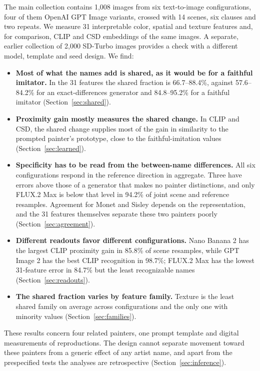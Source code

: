 \documentclass[10pt]{article}
\begin{document}
The main collection contains 1,008 images from six text-to-image configurations, four of them
OpenAI GPT Image variants, crossed with 14 scenes, six clauses and two repeats. We measure 31
interpretable color, spatial and texture features and, for comparison, CLIP \citep{radford2021}
and CSD \citep{somepalli2024style} embeddings of the same images. A separate, earlier
collection of 2,000 SD-Turbo images provides a check with a different model, template and seed
design. We find:
\begin{itemize}
\item \textbf{Most of what the names add is shared, as it would be for a faithful imitator.}
In the 31 features the shared fraction is 66.7--88.4\%, against 57.6--84.2\% for an
exact-differences generator and 84.8--95.2\% for a faithful imitator
(Section~\ref{sec:shared}).
\item \textbf{Proximity gain mostly measures the shared change.} In CLIP and CSD, the shared
change supplies most of the gain in similarity to the prompted painter's prototype, close to
the faithful-imitation values (Section~\ref{sec:learned}).
\item \textbf{Specificity has to be read from the between-name differences.} All six
configurations respond in the reference direction in aggregate. Three have errors above those
of a generator that makes no painter distinctions, and only FLUX.2 Max is below that level in
94.2\% of joint scene and reference resamples. Agreement for Monet and Sisley depends on the
representation, and the 31 features themselves separate these two painters poorly
(Section~\ref{sec:agreement}).
\item \textbf{Different readouts favor different configurations.} Nano Banana 2 has the
largest CLIP proximity gain in 85.8\% of scene resamples, while GPT Image 2 has the best CLIP
recognition in 98.7\%; FLUX.2 Max has the lowest 31-feature error in 84.7\% but the least
recognizable names (Section~\ref{sec:readouts}).
\item \textbf{The shared fraction varies by feature family.} Texture is the least shared
family on average across configurations and the only one with minority values
(Section~\ref{sec:families}).
\end{itemize}

These results concern four related painters, one prompt template and digital measurements of
reproductions. The design cannot separate movement toward these painters from a generic effect
of any artist name, and apart from the prespecified tests the analyses are retrospective
(Section~\ref{sec:inference}).
\end{document}
